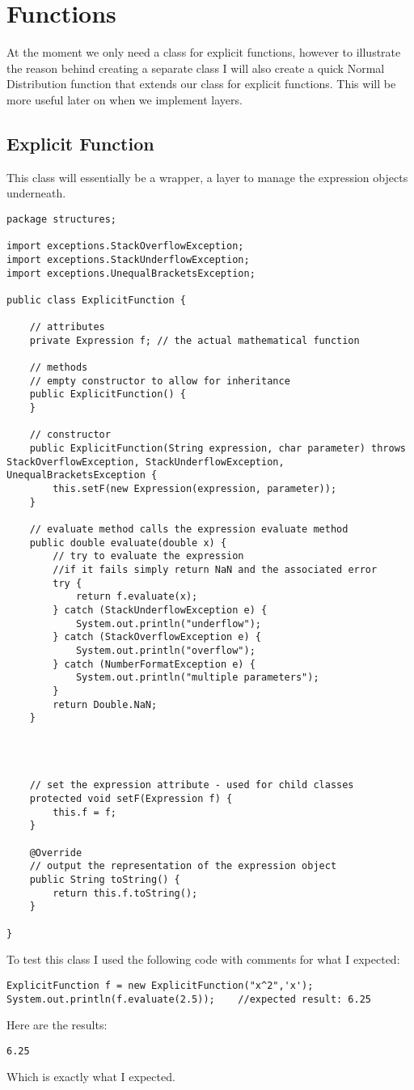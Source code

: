 \documentclass[../../../../main.tex]{subfiles}
\begin{document}
\section{Functions}
At the moment we only need a class for explicit functions, however to illustrate the reason behind creating a separate class I will also create a quick Normal Distribution function that extends our class for explicit functions. This will be more useful later on when we implement layers.

\subsection{Explicit Function}
This class will essentially be a wrapper, a layer to manage the expression objects underneath. 
\begin{verbatim}
package structures;

import exceptions.StackOverflowException;
import exceptions.StackUnderflowException;
import exceptions.UnequalBracketsException;

public class ExplicitFunction {

	// attributes
	private Expression f; // the actual mathematical function

	// methods
	// empty constructor to allow for inheritance
	public ExplicitFunction() {
	}

	// constructor
	public ExplicitFunction(String expression, char parameter) throws StackOverflowException, StackUnderflowException, UnequalBracketsException {
		this.setF(new Expression(expression, parameter));
	}

	// evaluate method calls the expression evaluate method
	public double evaluate(double x) {
		// try to evaluate the expression
		//if it fails simply return NaN and the associated error
		try {
			return f.evaluate(x);
		} catch (StackUnderflowException e) {
			System.out.println("underflow");
		} catch (StackOverflowException e) {
			System.out.println("overflow");
		} catch (NumberFormatException e) {
			System.out.println("multiple parameters");
		}
		return Double.NaN;
	}




	// set the expression attribute - used for child classes
	protected void setF(Expression f) {
		this.f = f;
	}

	@Override
	// output the representation of the expression object
	public String toString() {
		return this.f.toString();
	}

}
\end{verbatim}
To test this class I used the following code with comments for what I expected:
\begin{verbatim}
ExplicitFunction f = new ExplicitFunction("x^2",'x');
System.out.println(f.evaluate(2.5));	//expected result: 6.25
\end{verbatim}
Here are the results:
\begin{verbatim}
6.25
\end{verbatim}
Which is exactly what I expected.
\end{document}
